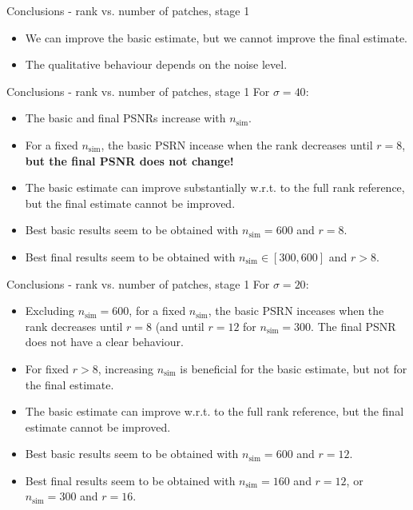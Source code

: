 \documentclass[mathserif, 8pt]{beamer}
\begin{document}
\begin{frame}{Conclusions - rank vs. number of patches, stage 1}
	\begin{itemize}\itemsep=2cm
		\item We can improve the basic estimate, but we cannot improve the final estimate.
		\item The qualitative behaviour depends on the noise level.
	\end{itemize}
\end{frame}

\begin{frame}{Conclusions - rank vs. number of patches, stage 1}
	For $\sigma = 40$:
	\begin{itemize}\itemsep=.3cm
		\item The basic and final PSNRs increase with $n_{\text{sim}}$.
		\item For a fixed $n_{\text{sim}}$, the basic PSRN incease when the
			rank decreases until $r = 8$, \textbf{but the final PSNR does not change!}
		\item The basic estimate can improve substantially w.r.t. to the
			full rank reference, but the final estimate cannot be improved.
		\item Best basic results seem to be obtained with $n_{\text{sim}} = 
			600$ and $r = 8$.
		\item Best final results seem to be obtained with $n_{\text{sim}}\in
			[300,600]$ and $r > 8$.
	\end{itemize}
\end{frame}

\begin{frame}{Conclusions - rank vs. number of patches, stage 1}
	For $\sigma = 20$:
	\begin{itemize}\itemsep=.3cm
		\item Excluding $n_{\text{sim}} = 600$, for a fixed
			$n_{\text{sim}}$, the basic PSRN inceases when the rank decreases
			until $r = 8$ (and until $r = 12$ for $n_{\text{sim}} = 300$.
			The final PSNR does not have a clear behaviour.
		\item For fixed $r > 8$, increasing $n_{\text{sim}}$ is beneficial for the
			basic estimate, but not for the final estimate.
		\item The basic estimate can improve w.r.t. to the
			full rank reference, but the final estimate cannot be improved.
		\item Best basic results seem to be obtained with $n_{\text{sim}} = 
			600$ and $r = 12$.
		\item Best final results seem to be obtained with $n_{\text{sim}}=
			160$ and $r = 12$, or $n_{\text{sim}}=
			300$ and $r = 16$.
	\end{itemize}
\end{frame}
\end{document}
